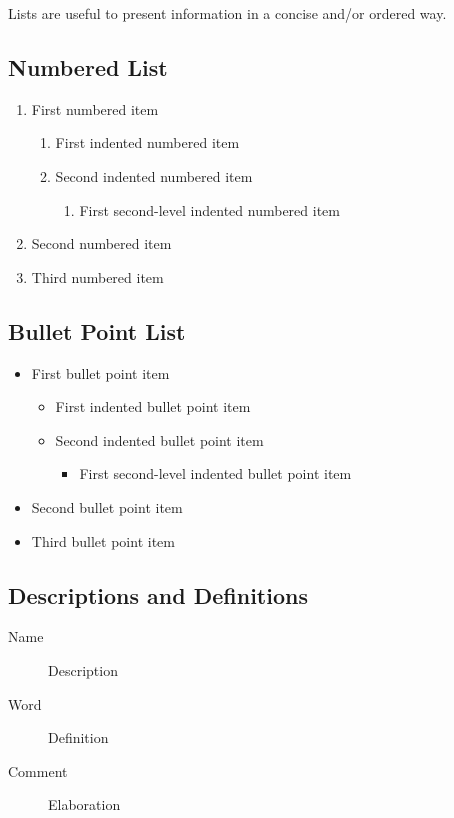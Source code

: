 \documentclass[
	11pt, %
	fleqn, %
	a4paper, %
]{LegrandOrangeBook}
\begin{document}
Lists are useful to present information in a concise and/or ordered way.

\subsection{Numbered List}

\begin{enumerate}
	\item First numbered item
	\begin{enumerate}
		\item First indented numbered item
		\item Second indented numbered item
		\begin{enumerate}
			\item First second-level indented numbered item
		\end{enumerate}
	\end{enumerate}
	\item Second numbered item
	\item Third numbered item
\end{enumerate}

\subsection{Bullet Point List}

\begin{itemize}
	\item First bullet point item
	\begin{itemize}
		\item First indented bullet point item
		\item Second indented bullet point item
		\begin{itemize}
			\item First second-level indented bullet point item
		\end{itemize}
	\end{itemize}
	\item Second bullet point item
	\item Third bullet point item
\end{itemize}

\subsection{Descriptions and Definitions}

\begin{description}
	\item[Name] Description
	\item[Word] Definition
	\item[Comment] Elaboration
\end{description}
\end{document}
